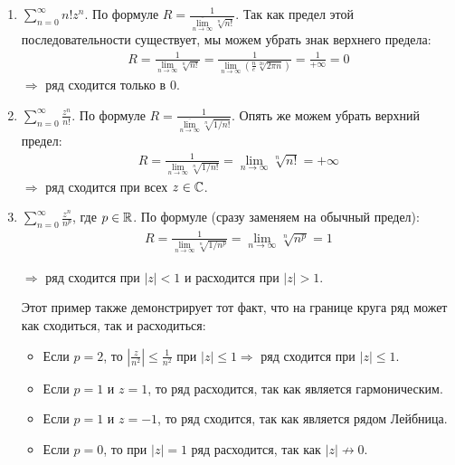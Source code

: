 \begin{examples}
    \begin{enumerate}
        \item $\sum\limits_{n=0}^\infty n!z^n$. 
        По формуле $R = \frac{1}{\overline{\lim\limits_{n \to \infty}} \sqrt[n]{n!}}$. 
        Так как предел этой последовательности существует, мы можем убрать знак верхнего предела: 
        \begin{gather*}
            R = \frac{1}{\lim\limits_{n \to \infty} \sqrt[n]{n!}} = \frac{1}{\lim\limits_{n \to \infty} (\frac{n}{e}\sqrt[2n]{2\pi n})} = \frac{1}{+\infty} = 0
        \end{gather*}
        $\Longrightarrow$ ряд сходится только в 0.
        \item $\sum\limits_{n=0}^\infty \frac{z^n}{n!}$. 
        По формуле $R = \frac{1}{\overline{\lim\limits_{n \to \infty}} \sqrt[n]{1/n!}}$.
        Опять же можем убрать верхний предел: 
        \begin{gather*}
            R = \frac{1}{\lim\limits_{n \to \infty} \sqrt[n]{1/n!}} = \lim\limits_{n \to \infty} \sqrt[n]{n!} = +\infty
        \end{gather*}
        $\Longrightarrow$ ряд сходится при всех $z \in \mathbb{C}$.
        \item $\sum\limits_{n=0}^\infty \frac{z^n}{n^p}$, где $p \in \mathbb{R}$.
        По формуле (сразу заменяем на обычный предел): 
        \begin{gather*} 
            R = \frac{1}{\lim\limits_{n \to \infty} \sqrt[n]{1/n^p}} = \lim\limits_{n \to \infty} \sqrt[n]{n^p} = 1
        \end{gather*}
        
        $\Longrightarrow$ ряд сходится при $|z| < 1$ и расходится при $|z| > 1$.

        Этот пример также демонстрирует тот факт, что на границе круга ряд может как сходиться, так и расходиться: \begin{itemize}
            \item Если $p = 2$, то $|\frac{z}{n^2}| \leqslant \frac{1}{n^2}$ при $|z| \leqslant 1 \Rightarrow$ ряд сходится при $|z| \leqslant 1$.
            \item Если $p = 1$ и $z = 1$, то ряд расходится, так как является гармоническим.
            \item Если $p = 1$ и $z = -1$, то ряд сходится, так как является рядом Лейбница.
            \item Если $p = 0$, то при $|z| = 1$ ряд расходится, так как $|z| \nrightarrow 0$.
        \end{itemize}
    \end{enumerate}    
\end{examples}
